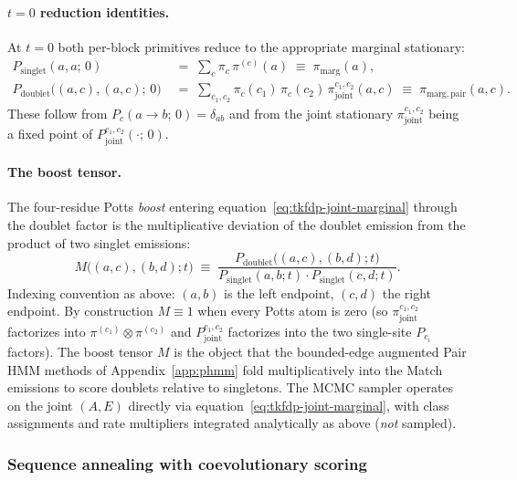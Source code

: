 \paragraph{$t = 0$ reduction identities.}
At $t = 0$ both per-block primitives reduce to the appropriate
marginal stationary:
\begin{align}
\label{eq:p-singlet-t0}
P_{\mathrm{singlet}}(a, a;\, 0)
  \;&=\; \sum_c \pi_c \, \pi^{(c)}(a) \;\equiv\; \pi_{\mathrm{marg}}(a), \\
\label{eq:p-doublet-t0}
P_{\mathrm{doublet}}\bigl((a, c), (a, c);\, 0\bigr)
  \;&=\; \sum_{c_1, c_2} \pi_c(c_1) \, \pi_c(c_2) \,
        \pi_{\mathrm{joint}}^{c_1, c_2}(a, c)
        \;\equiv\; \pi_{\mathrm{marg, pair}}(a, c).
\end{align}
These follow from $P_c(a \to b;\, 0) = \delta_{ab}$ and from the
joint stationary $\pi_{\mathrm{joint}}^{c_1, c_2}$ being a
fixed point of $P_{\mathrm{joint}}^{c_1, c_2}(\cdot;\, 0)$.

\paragraph{The boost tensor.}
The four-residue Potts \emph{boost} entering equation~\ref{eq:tkfdp-joint-marginal}
through the doublet factor is the multiplicative deviation of the
doublet emission from the product of two singlet emissions:
\begin{equation}
\label{eq:M-boost}
M\bigl((a, c), (b, d); t\bigr)
  \;\equiv\;
  \frac{P_{\mathrm{doublet}}\bigl((a, c), (b, d); t\bigr)}
       {P_{\mathrm{singlet}}(a, b; t) \cdot P_{\mathrm{singlet}}(c, d; t)}.
\end{equation}
Indexing convention as above: $(a, b)$ is the left endpoint, $(c, d)$
the right endpoint. By construction $M \equiv 1$ when every Potts
atom is zero (so $\pi_{\mathrm{joint}}^{c_1, c_2}$ factorizes into
$\pi^{(c_1)} \otimes \pi^{(c_2)}$ and $P_{\mathrm{joint}}^{c_1, c_2}$
factorizes into the two single-site $P_{c_i}$ factors). The boost
tensor $M$ is the object that the bounded-edge augmented Pair HMM
methods of Appendix~\ref{app:phmm} fold multiplicatively into the
Match emissions to score doublets relative to singletons. The MCMC
sampler operates on the joint $(A, E)$ directly via
equation~\ref{eq:tkfdp-joint-marginal}, with class assignments and
rate multipliers integrated analytically as above (\emph{not}
sampled).

\subsubsection*{Sequence annealing with coevolutionary scoring}
\label{sec:coupled-annealing}

